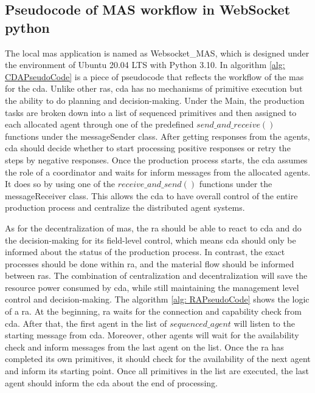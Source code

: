 \subsection{Pseudocode of MAS workflow in WebSocket python}\label{chap: Meth-WS-MAS}
The local \gls{mas} application is named as Websocket\_MAS, which is designed under the 
environment of Ubuntu 20.04 LTS with Python 3.10. 
In algorithm \ref{alg: CDAPseudoCode} is a piece of pseudocode that reflects the workflow of the \gls{mas} for the \gls{cda}. 
Unlike other \gls{ras}, \gls{cda} has no mechanisms of primitive execution but the ability to do planning and decision-making. 
Under the Main, the production tasks are broken down into a list of sequenced primitives and then assigned to each allocated agent through one of the predefined $send\_and\_receive()$ functions under the messageSender class.
After getting responses from the agents, \gls{cda} should decide whether to start processing positive responses or retry the steps by negative responses.  
Once the production process starts, the \gls{cda} assumes the role of a coordinator and waits for inform messages from the allocated agents. It does so by using one of the $receive\_and\_send()$ functions under the messageReceiver class. This allows the \gls{cda} to have overall control of the entire production process and centralize the distributed agent systems.


As for the decentralization of \gls{mas}, the \gls{ra} should be able to react to \gls{cda} and do the decision-making for its field-level control, which means \gls{cda} should only be informed about the status of the production process. In contrast, the exact processes should be done within \gls{ra}, and the material flow should be informed between \gls{ras}. The combination of centralization and decentralization will save the resource power consumed by \gls{cda}, 
while still maintaining the management level control and decision-making.  
The algorithm \ref{alg: RAPseudoCode} shows the logic of a \gls{ra}. At the beginning, \gls{ra} waits for the connection and capability check from \gls{cda}. After that, the first agent in the list of $sequenced\_agent$ will listen to the starting message from \gls{cda}. 
Moreover, other agents will wait for the availability check and inform messages from the last agent on the list. 
Once the \gls{ra} has completed its own primitives, it should check for the availability of the next agent and inform its starting point. 
Once all primitives in the list are executed, the last agent should inform the \gls{cda} about the end of processing.


